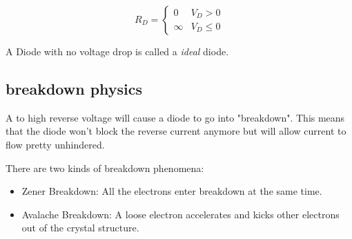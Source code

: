 \documentclass[11ypt]{extarticle}
\begin{document}
\begin{equation}
    R_D = 
    \begin{cases}
        {0} & {V_D > 0} \\
        {\infty} & {V_D \leq 0}
    \end{cases}      
\end{equation}

A Diode with no voltage drop is called a \textit{ideal} diode.

\subsection{breakdown physics}

A to high reverse voltage will cause a diode to go into "breakdown". This means that the diode won't block the reverse current anymore but will allow current to flow pretty unhindered.


There are two kinds of breakdown phenomena:
\begin{itemize}
	\item Zener Breakdown: All the electrons enter breakdown at the same time.
	\item Avalache Breakdown: A loose electron accelerates and kicks other electrons out of the crystal structure.
\end{itemize}
\end{document}
